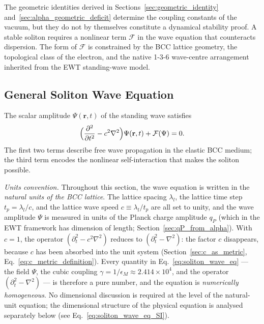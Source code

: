 \documentclass[10pt,a4paper]{article}
\begin{document}
The geometric identities derived in Sections~\ref{sec:geometric_identity}
and~\ref{sec:alpha_geometric_deficit} determine the coupling constants of the
vacuum, but they do not by themselves constitute a dynamical stability proof.
A stable soliton requires a nonlinear term $\mathcal{F}$ in the wave equation
that counteracts dispersion. The form of $\mathcal{F}$ is constrained by the
BCC lattice geometry, the topological class of the electron, and the native
1-3-6 wave-centre arrangement inherited from the EWT standing-wave model.

\subsection{General Soliton Wave Equation}

The scalar amplitude $\Psi(\mathbf{r},t)$ of the standing wave satisfies
\begin{equation}\label{eq:soliton_wave_eq}
	\Bigl( \frac{\partial^{2}}{\partial t^{2}} - c^{2}\nabla^{2} \Bigr)
	\Psi(\mathbf{r},t) + \mathcal{F}(\Psi) = 0 .
\end{equation}
The first two terms describe free wave propagation in the elastic BCC
medium; the third term encodes the nonlinear self-interaction that makes
the soliton possible.

\emph{Units convention.} Throughout this section, the wave equation is
written in the \emph{natural units of the BCC lattice}. The lattice
spacing $\lambda_l$, the lattice time step $t_p = \lambda_l/c$, and the
lattice wave speed $c \equiv \lambda_l/t_p$ are all set to unity, and
the wave amplitude $\Psi$ is measured in units of the Planck charge
amplitude $q_P$ (which in the EWT framework has dimension of length;
Section~\ref{sec:qP_from_alpha}). With $c = 1$, the operator
$(\partial_t^2 - c^2\nabla^2)$ reduces to $(\partial_t^2 - \nabla^2)$:
the factor $c$ disappears, because $c$ has been absorbed into the unit
system (Section~\ref{sec:c_as_metric},
Eq.~\eqref{eq:c_metric_definition}). Every quantity in
Eq.~\eqref{eq:soliton_wave_eq} --- the field $\Psi$, the cubic coupling
$\gamma = 1/\epsilon_M \approx 2.414 \times 10^4$, and the operator
$(\partial_t^2 - \nabla^2)$ --- is therefore a pure number, and the
equation is \emph{numerically homogeneous}. No dimensional discussion
is required at the level of the natural-unit equation; the dimensional
structure of the physical equation is analysed separately below (see
Eq.~\eqref{eq:soliton_wave_eq_SI}).
\end{document}
